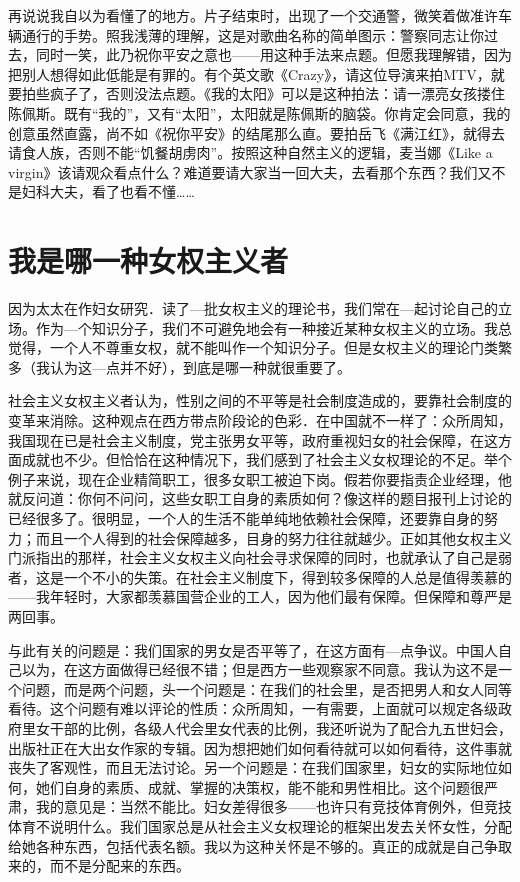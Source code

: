 再说说我自以为看懂了的地方。片子结束时，出现了一个交通警，微笑着做准许车辆通行的手势。照我浅薄的理解，这是对歌曲名称的简单图示：警察同志让你过去，同时一笑，此乃祝你平安之意也——用这种手法来点题。但愿我理解错，因为把别人想得如此低能是有罪的。有个英文歌《Crazy》，请这位导演来拍MTV，就要拍些疯子了，否则没法点题。《我的太阳》可以是这种拍法：请一漂亮女孩搂住陈佩斯。既有“我的”，又有“太阳”，太阳就是陈佩斯的脑袋。你肯定会同意，我的创意虽然直露，尚不如《祝你平安》的结尾那么直。要拍岳飞《满江红》，就得去请食人族，否则不能“饥餐胡虏肉”。按照这种自然主义的逻辑，麦当娜《Like a virgin》该请观众看点什么？难道要请大家当一回大夫，去看那个东西？我们又不是妇科大夫，看了也看不懂……
 
\chapter{我是哪一种女权主义者}

因为太太在作妇女研究．读了—批女权主义的理论书，我们常在—起讨论自己的立场。作为—个知识分子，我们不可避免地会有一种接近某种女权主义的立场。我总觉得，一个人不尊重女权，就不能叫作一个知识分子。但是女权主义的理论门类繁多（我认为这—点并不好），到底是哪一种就很重要了。 

社会主义女权主义者认为，性别之间的不平等是社会制度造成的，要靠社会制度的变革来消除。这种观点在西方带点阶段论的色彩．在中国就不一样了：众所周知，我国现在已是社会主义制度，党主张男女平等，政府重视妇女的社会保障，在这方面成就也不少。但恰恰在这种情况下，我们感到了社会主义女权理论的不足。举个例子来说，现在企业精简职工，很多女职工被迫下岗。假若你要指责企业经理，他就反问道：你何不问问，这些女职工自身的素质如何？像这样的题目报刊上讨论的已经很多了。很明显，一个人的生活不能单纯地依赖社会保障，还要靠自身的努力；而且一个人得到的社会保障越多，目身的努力往往就越少。正如其他女权主义门派指出的那样，社会主义女权主义向社会寻求保障的同时，也就承认了自己是弱者，这是一个不小的失策。在社会主义制度下，得到较多保障的人总是值得羡慕的——我年轻时，大家都羡慕国营企业的工人，因为他们最有保障。但保障和尊严是两回事。 

与此有关的问题是：我们国家的男女是否平等了，在这方面有—点争议。中国人自己以为，在这方面做得已经很不错；但是西方一些观察家不同意。我认为这不是一个问题，而是两个问题，头一个问题是：在我们的社会里，是否把男人和女人同等看待。这个问题有难以评论的性质：众所周知，一有需要，上面就可以规定各级政府里女干部的比例，各级人代会里女代表的比例，我还听说为了配合九五世妇会，出版社正在大出女作家的专辑。因为想把她们如何看待就可以如何看待，这件事就丧失了客观性，而且无法讨论。另一个问题是：在我们国家里，妇女的实际地位如何，她们自身的素质、成就、掌握的决策权，能不能和男性相比。这个问题很严肃，我的意见是：当然不能比。妇女差得很多——也许只有竞技体育例外，但竞技体育不说明什么。我们国家总是从社会主义女权理论的框架出发去关怀女性，分配给她各种东西，包括代表名额。我以为这种关怀是不够的。真正的成就是自己争取来的，而不是分配来的东西。 

